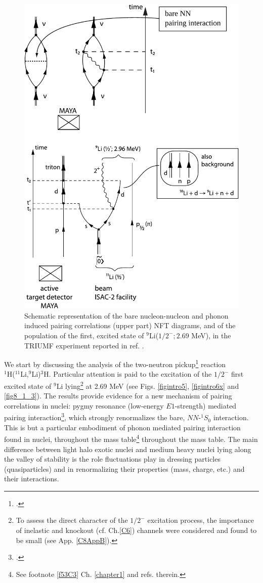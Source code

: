  \begin{figure}
 \centerline{\includegraphics*[width=12cm,angle=0]{C8/figsC8/fig8_1_1}}
 	\caption{Schematic representation of the bare nucleon-nucleon and phonon induced pairing correlations (upper part) NFT diagrams, and of the population of the first, excited state of $^{9}$Li($1/2^{-}; 2.69$ MeV), in the TRIUMF experiment  reported in ref. \cite{Tanihata:08}.}\label{fig8_1_1}
 \end{figure}
 We start by discussing  the analysis of the two-neutron pickup\footnote{\cite{Tanihata:08}.} reaction\\ $^1$H($^{11}$Li,$^9$Li)$^3$H. Particular  attention is paid to the  excitation of the $1/2^-$ first excited state of $^9$Li lying\footnote{To assess the direct character of the $1/2^-$ excitation process, the importance of inelastic  and knockout (cf. Ch.\ref{C6}) channels were considered and found to be small (see App. \ref{C8AppB}).} at 2.69 MeV (see Figs. \ref{figintro5}, \ref{figintro6x} and  \ref{fig8_1_3}). The results  provide evidence for a new mechanism of pairing correlations in nuclei: pygmy resonance (low-energy $E1$-strength) mediated pairing interaction\footnote{\citet{Barranco:01,Potel:10}.}, which strongly renormalizes the bare, $NN$-$^1S_0$ interaction. This is but a particular embodiment of phonon mediated pairing interaction found  in nuclei, throughout the mass table\footnote{See footnote \ref{f53C3} Ch. \ref{chapter1} and refs. therein.} throughout the mass table. The main difference between light halo exotic nuclei and medium heavy  nuclei lying along the valley of stability is the role fluctuations play in dressing particles (quasiparticles) and in renormalizing their properties (mass, charge, etc.) and their interactions.
